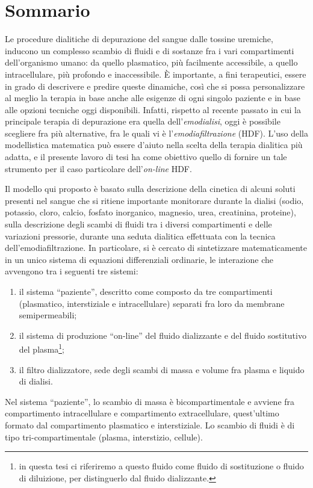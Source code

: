 \chapter*{Sommario}
Le procedure dialitiche di depurazione del sangue dalle tossine uremiche, inducono un complesso scambio di fluidi e di sostanze fra i vari compartimenti dell'organismo umano: da quello plasmatico, più facilmente accessibile, a quello intracellulare, più profondo e inaccessibile. È importante, a fini terapeutici, essere in grado di descrivere e predire queste dinamiche, così che si possa personalizzare al meglio la terapia in base anche alle esigenze di ogni singolo paziente e in base alle opzioni tecniche oggi disponibili. Infatti, rispetto al recente passato in cui la principale terapia di depurazione era quella dell'\textit{emodialisi}, oggi è possibile scegliere fra più alternative, fra le quali vi è l'\textit{emodiafiltrazione} (HDF).
L'uso della modellistica matematica può essere d'aiuto nella scelta della terapia dialitica più adatta, e il presente lavoro di tesi ha come obiettivo quello di fornire un tale strumento per il caso particolare dell'\textit{on-line} HDF. 

Il modello qui proposto è basato sulla descrizione della cinetica di alcuni soluti presenti nel sangue che si ritiene importante monitorare durante la dialisi (sodio, potassio, cloro, calcio, fosfato inorganico, magnesio, urea, creatinina, proteine), sulla descrizione degli scambi di fluidi tra i diversi compartimenti e delle variazioni pressorie, durante una seduta dialitica effettuata con la tecnica dell'emodiafiltrazione. In particolare, si è cercato di sintetizzare matematicamente in un unico sistema di equazioni differenziali ordinarie, le interazione che avvengono tra i seguenti tre sistemi:
\begin{enumerate}
	\item il sistema ``paziente'', descritto come composto da tre compartimenti (plasmatico, interstiziale e intracellulare) separati fra loro da membrane semipermeabili;
	\item il sistema di produzione ``on-line'' del fluido dializzante e del fluido sostitutivo del plasma\footnote{in questa tesi ci riferiremo a questo fluido come fluido di sostituzione o fluido di diluizione, per distinguerlo dal fluido dializzante.};
	\item il filtro dializzatore, sede degli scambi di massa e volume fra plasma e liquido di dialisi.
\end{enumerate}
Nel sistema ``paziente'', lo scambio di massa è bicompartimentale e avviene fra compartimento intracellulare e compartimento extracellulare, quest'ultimo formato dal compartimento plasmatico e interstiziale. Lo scambio di fluidi è di tipo tri-compartimentale (plasma, interstizio, cellule).

